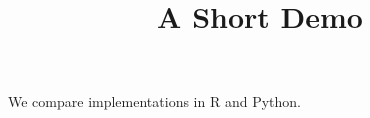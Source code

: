 \documentclass[article]{jss}
\title{A Short Demo}
\begin{document}
We compare implementations in R and Python.
\end{document}
